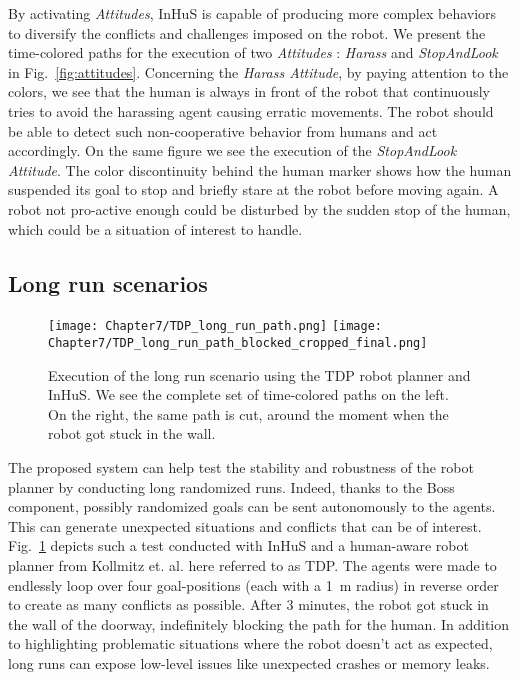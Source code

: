 By activating \textit{Attitudes}, InHuS is capable of producing more complex behaviors to diversify the conflicts and challenges imposed on the robot.
We present the time-colored paths for the execution of two \textit{Attitudes} : \textit{Harass} and \textit{StopAndLook} in Fig.~\ref{fig:attitudes}. Concerning the \textit{Harass Attitude}, by paying attention to the colors, we see that the human is always in front of the robot that continuously tries to avoid the harassing agent causing erratic movements. The robot should be able to detect such non-cooperative behavior from humans and act accordingly.
On the same figure we see the execution of the \textit{StopAndLook Attitude}. The color discontinuity behind the human marker shows how the human suspended its goal to stop and briefly stare at the robot before moving again. A robot not pro-active enough could be disturbed by the sudden stop of the human, which could be a situation of interest to handle. 


\subsection{Long run scenarios}


\begin{figure}
    \centering
    \texttt{[image: Chapter7/TDP\_long\_run\_path.png]}
    \texttt{[image: Chapter7/TDP\_long\_run\_path\_blocked\_cropped\_final.png]}
    \caption{Execution of the long run scenario using the TDP robot planner and InHuS. We see the complete set of time-colored paths on the left. On the right, the same path is cut, around the moment when the robot got stuck in the wall. 
    }
    \label{fig:long_run_block}
    \vspace{-0.3cm}
\end{figure}

The proposed system can help test the stability and robustness of the robot planner by conducting long randomized runs. Indeed, thanks to the Boss component, possibly randomized goals can be sent autonomously to the agents. This can generate unexpected situations and conflicts that can be of interest.
Fig.~\ref{fig:long_run_block} depicts such a test conducted with InHuS and a human-aware robot planner from Kollmitz et. al. \cite{kollmitz_time_2015} here referred to as TDP. The agents were made to endlessly loop over four goal-positions (each with a \SI{1}{\metre} radius) in reverse order to create as many conflicts as possible. After 3 minutes, the robot got stuck in the wall of the doorway, indefinitely blocking the path for the human. In addition to highlighting problematic situations where the robot doesn't act as expected, long runs can expose low-level issues like unexpected crashes or memory leaks.


